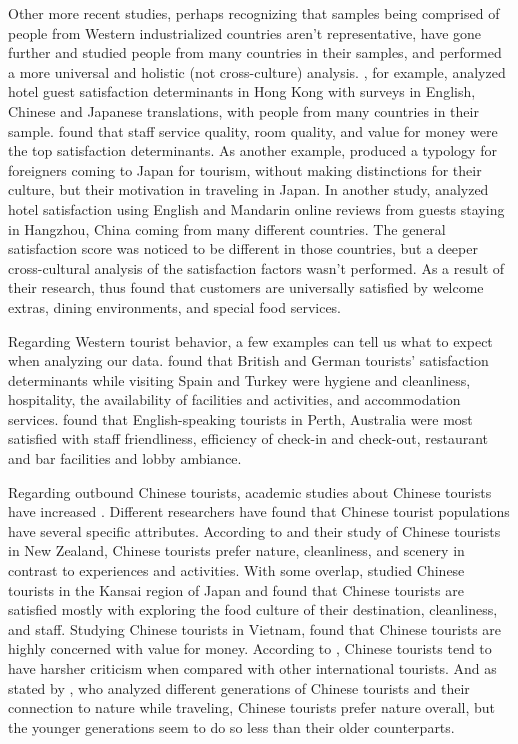 Other more recent studies, perhaps recognizing that samples being comprised of people from Western industrialized countries aren't representative, have gone further and studied people from many countries in their samples, and performed a more universal and holistic (not cross-culture) analysis. \cite{choi2001}, for example, analyzed hotel guest satisfaction determinants in Hong Kong with surveys in English, Chinese and Japanese translations, with people from many countries in their sample. \cite{choi2001} found that staff service quality, room quality, and value for money were the top satisfaction determinants. As another example, \cite{Uzama2012} produced a typology for foreigners coming to Japan for tourism, without making distinctions for their culture, but their motivation in traveling in Japan. In another study, \cite{zhou2014} analyzed hotel satisfaction using English and Mandarin online reviews from guests staying in Hangzhou, China coming from many different countries. The general satisfaction score was noticed to be different in those countries, but a deeper cross-cultural analysis of the satisfaction factors wasn't performed. As a result of their research, \cite{zhou2014} thus found that customers are universally satisfied by welcome extras, dining environments, and special food services. 

Regarding Western tourist behavior, a few examples can tell us what to expect when analyzing our data. \cite{kozak2002} found that British and German tourists' satisfaction determinants while visiting Spain and Turkey were hygiene and cleanliness, hospitality, the availability of facilities and activities, and accommodation services. \cite{shanka2004} found that English-speaking tourists in Perth, Australia were most satisfied with staff friendliness, efficiency of check-in and check-out, restaurant and bar facilities and lobby ambiance. 

Regarding outbound Chinese tourists, academic studies about Chinese tourists have increased \cite[][]{sun2017}. Different researchers have found that Chinese tourist populations have several specific attributes. According to \cite{ryan2001} and their study of Chinese tourists in New Zealand, Chinese tourists prefer nature, cleanliness, and scenery in contrast to experiences and activities. With some overlap, \cite{dongyang2015} studied Chinese tourists in the Kansai region of Japan and found that Chinese tourists are satisfied mostly with exploring the food culture of their destination, cleanliness, and staff. Studying Chinese tourists in Vietnam, \cite{truong2009} found that Chinese tourists are highly concerned with value for money. According to \cite{liu2019}, Chinese tourists tend to have harsher criticism when compared with other international tourists. And as stated by \cite{gao2017chinese}, who analyzed different generations of Chinese tourists and their connection to nature while traveling, Chinese tourists prefer nature overall, but the younger generations seem to do so less than their older counterparts. 

